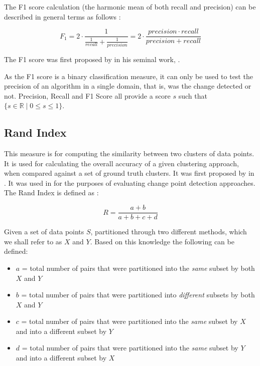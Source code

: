\documentclass[../main.tex]{subfiles}
\begin{document}
	The F1 score calculation (the harmonic mean of both recall and precision) can be described in general terms as follows \cite{VanRijsbergen1979}:

	\begin{equation}
		F_1 = 2 \cdot \frac{1}{\frac{1}{recall} + \frac{1}{precision}} = 2 \cdot \frac{precision \cdot recall}{precision+recall}
		\label{equ:F1}
	\end{equation}

    The F1 score was first proposed by \citeauthor{VanRijsbergen1979} in his seminal work, .

	As the F1 score is a binary classification measure, it can only be used to test the precision of an algorithm in a single domain, that is, was the change detected or not. Precision, Recall and F1 Score all provide a score $s$ such that $ \{s\in\mathbb{R} \mid 0\leq s \leq 1\} $.

\subsection{Rand Index}

This measure is for computing the similarity between two clusters of data points. It is used for calculating the overall accuracy of a given clustering approach, when compared against a set of ground truth clusters. It was first proposed by \citeauthor{Rand1971} in . It was used in \cite{Matteson2012} for the purposes of evaluating change point detection approaches. The Rand Index is defined as \cite{Rand1971}:

	\begin{equation}
		R = \frac{a+b}{a+b+c+d}
	\end{equation}
	
	Given a set of data points $S$, partitioned through two different methods, which we shall refer to as $X$ and $Y$. Based on this knowledge the following can be defined:
	
	\begin{itemize}
		\item $a$ = total number of pairs that were partitioned into the \emph{same} subset by both $X$ and $Y$
		\item $b$ = total number of pairs that were partitioned into \emph{different} subsets by both $X$ and $Y$
		\item $c$ = total number of pairs that were partitioned into the \emph{same} subset by $X$ and into a different subset by $Y$
		\item $d$ = total number of pairs that were partitioned into the \emph{same} subset by $Y$ and into a different subset by $X$
	\end{itemize}
	
\end{document}
